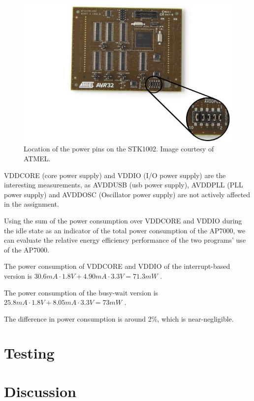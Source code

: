 \begin{figure}
\includegraphics[width = \textwidth]{results-and-tests/power-pins-location.jpg}
\caption{Location of the power pins on the STK1002. Image courtesy of ATMEL.}
\label{power-pins-location}
\end{figure}

VDDCORE (core power supply) and VDDIO (I/O power supply) are the interesting measurements, as AVDDUSB (usb power supply), AVDDPLL (PLL power supply) and AVDDOSC (Oscillator power supply) are not actively affected in the assignment.

Using the sum of the power consumption over VDDCORE and VDDIO during the idle state as an indicator of the total power consumption of the AP7000, we can evaluate the relative energy efficiency performance of the two programs' use of the AP7000.

The power consumption of VDDCORE and VDDIO of the interrupt-based version is 
$
30.6mA \cdot 1.8V +
4.90mA \cdot 3.3V
=
71.3mW
$
.

The power consumption of the busy-wait version is 
$
25.8mA \cdot 1.8V +
8.05mA \cdot 3.3V
=
73mW
$
.


The difference in power consumption is around 2\%, which is near-negligible.

\section{Testing}

	

\section{Discussion}
    
	
